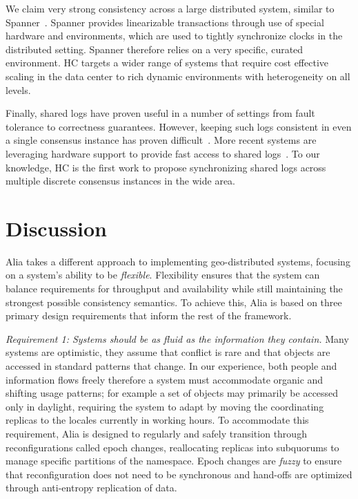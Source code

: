 \documentclass[10pt,conference]{IEEEtran}
\begin{document}
We claim very strong consistency across a large distributed system, similar
to Spanner~\cite{spanner}.
Spanner provides linearizable  transactions through use of special hardware
and environments, which are used to tightly synchronize clocks in the
distributed setting.
Spanner therefore relies on a very specific, curated environment.
HC targets a wider range of systems that require cost effective scaling in
the data center to rich dynamic environments with heterogeneity on all levels.

Finally, shared logs have proven useful in a number of settings from fault
tolerance to correctness guarantees.
However, keeping such logs consistent in even a single consensus instance has
proven difficult~\cite{chubby,zookeeper}.
More recent systems are leveraging hardware support to provide fast access to
shared logs~\cite{vcorfu,tango,fawn}.
To our knowledge, HC is the first work to propose synchronizing shared logs
across multiple discrete consensus instances in the wide area.


\section{Discussion}
\label{section:discussion}

Alia takes a different approach to implementing geo-distributed systems, focusing
on a system's ability to be \emph{flexible}.
Flexibility ensures that the system can balance requirements for throughput and
availability while still maintaining the strongest possible consistency semantics.
To achieve this, Alia is based on three primary design requirements that inform the
rest of the framework.

\emph{Requirement 1: Systems should be as fluid as the information they contain.}
Many systems are optimistic, they assume that conflict is rare and that objects are
accessed in standard patterns that change.
In our experience, both people and information flows freely therefore a system must
accommodate organic and shifting usage patterns; for example a set of objects may
primarily be accessed only in daylight, requiring the system to adapt by moving the
coordinating replicas to the locales currently in working hours.
To accommodate this requirement, Alia is designed to regularly and safely transition
through reconfigurations called epoch changes, reallocating replicas into subquorums
to manage specific partitions of the namespace.
Epoch changes are \emph{fuzzy} to ensure that reconfiguration does not need to be
synchronous and hand-offs are optimized through anti-entropy replication of data.
\end{document}
